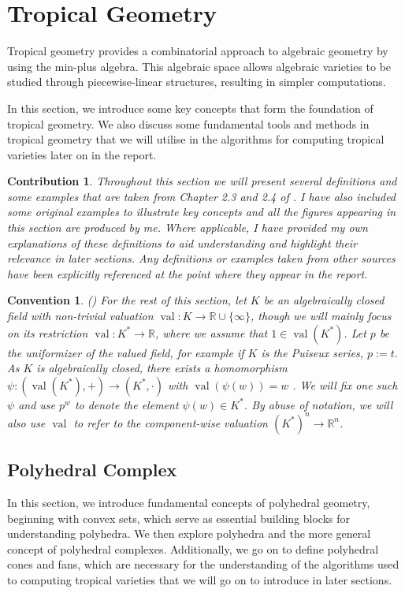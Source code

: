 \documentclass[11pt,reqno,a4paper]{article}
\theoremstyle{theoremstyle}
\theoremstyle{examplestyle}
\newtheorem*{convention*}{Convention}
\newtheorem*{contribution*}{Contribution}
\theoremstyle{algorithmstyle}
\numberwithin{equation}{subsection}
\newcommand{\RR}{\mathbb{R}}
\DeclareMathOperator{\val}{val}
\begin{document}
\section{Tropical Geometry} \label{sec:2}
Tropical geometry provides a combinatorial approach to algebraic geometry by using the min-plus algebra. This algebraic space allows algebraic varieties to be studied through piecewise-linear structures, resulting in simpler computations. 

In this section, we introduce some key concepts that form the foundation of tropical geometry. We also discuss some fundamental tools and methods in tropical geometry that we will utilise in the algorithms for computing tropical varieties later on in the report.

\begin{contribution*}
    Throughout this section we will present several definitions and some examples that are taken from Chapter 2.3 and 2.4 of \cite{MS2015}. I have also included some original examples to illustrate key concepts and all the figures appearing in this section are produced by me. Where applicable, I have provided my own explanations of these definitions to aid understanding and highlight their relevance in later sections. Any definitions or examples taken from other sources have been explicitly referenced at the point where they appear in the report.
\end{contribution*}

\begin{convention*}
    (\cite{HR2018}) For the rest of this section, let $K$ be an algebraically closed field with non-trivial valuation $\val: K \to \RR \cup \{ \infty\}$, though we will mainly focus on its restriction $\val: K^* \to \RR$, where we assume that $1\in \val(K^*)$. Let $p$ be the uniformizer of the valued field, for example if $K$ is the Puiseux series, $p:=t.$ As $K$ is algebraically closed, there exists a homomorphism $\psi : (\val(K^*),+) \to (K^*, \cdot)$ with $\val(\psi(w)) = w$ \cite[Lem. 2.1.15]{MS2015}. We will fix one such $\psi$ and use $p^w$ to denote the element $\psi(w) \in K^*$. By abuse of notation, we will also use $\val$ to refer to the component-wise valuation $(K^*)^n \to \RR^n$.
\end{convention*}

\subsection{Polyhedral Complex}
In this section, we introduce fundamental concepts of polyhedral geometry, beginning with convex sets, which serve as essential building blocks for understanding polyhedra. We then explore polyhedra and the more general concept of polyhedral complexes. Additionally, we go on to define polyhedral cones and fans, which are necessary for the understanding of the algorithms used to computing tropical varieties that we will go on to introduce in later sections.
\end{document}
